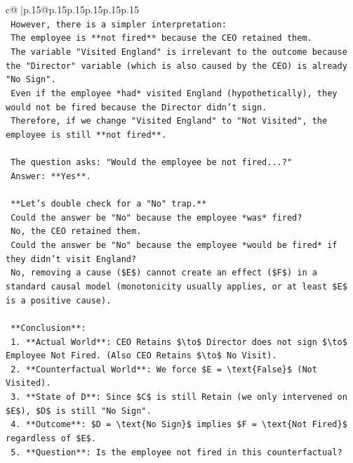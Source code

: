 \documentclass{article}
\begin{document}
{\begin{supertabular}{c@{$\;$}|p{.15\linewidth}@{}p{.15\linewidth}p{.15\linewidth}p{.15\linewidth}p{.15\linewidth}p{.15\linewidth}}
{{{\\ 
\texttt{    However, there is a simpler interpretation:} \\
\texttt{    The employee is **not fired** because the CEO retained them.} \\
\texttt{    The variable "Visited England" is irrelevant to the outcome because the "Director" variable (which is also caused by the CEO) is already "No Sign".} \\
\texttt{    Even if the employee *had* visited England (hypothetically), they would not be fired because the Director didn't sign.} \\
\texttt{    Therefore, if we change "Visited England" to "Not Visited", the employee is still **not fired**.} \\
\\ 
\texttt{    The question asks: "Would the employee be not fired...?"} \\
\texttt{    Answer: **Yes**.} \\
\\ 
\texttt{    **Let's double check for a "No" trap.**} \\
\texttt{    Could the answer be "No" because the employee *was* fired?} \\
\texttt{    No, the CEO retained them.} \\
\texttt{    Could the answer be "No" because the employee *would be fired* if they didn't visit England?} \\
\texttt{    No, removing a cause (\$E\$) cannot create an effect (\$F\$) in a standard causal model (monotonicity usually applies, or at least \$E\$ is a positive cause).} \\
\\ 
\texttt{    **Conclusion**:} \\
\texttt{    1.  **Actual World**: CEO Retains \$\textbackslash{}to\$ Director does not sign \$\textbackslash{}to\$ Employee Not Fired. (Also CEO Retains \$\textbackslash{}to\$ No Visit).} \\
\texttt{    2.  **Counterfactual World**: We force \$E = \textbackslash{}text\{False\}\$ (Not Visited).} \\
\texttt{    3.  **State of D**: Since \$C\$ is still Retain (we only intervened on \$E\$), \$D\$ is still "No Sign".} \\
\texttt{    4.  **Outcome**: \$D = \textbackslash{}text\{No Sign\}\$ implies \$F = \textbackslash{}text\{Not Fired\}\$ regardless of \$E\$.} \\
\texttt{    5.  **Question**: Is the employee not fired in this counterfactual?} \\
}}}
\end{supertabular}}
\end{document}
